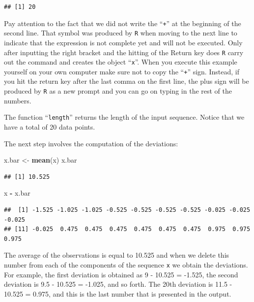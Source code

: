 \documentclass[]{krantz}
\makeatletter
\newenvironment{Shaded}{\begin{snugshade}}{\end{snugshade}}
\newcommand{\KeywordTok}[1]{\textcolor[rgb]{0.13,0.29,0.53}{\textbf{#1}}}
\newcommand{\NormalTok}[1]{#1}
\newcommand{\OperatorTok}[1]{\textcolor[rgb]{0.81,0.36,0.00}{\textbf{#1}}}
\newcommand{\StringTok}[1]{\textcolor[rgb]{0.31,0.60,0.02}{#1}}
\newenvironment{kframe}{%
\medskip{}
\setlength{\fboxsep}{.8em}
 \def\at@end@of@kframe{}%
 \ifinner\ifhmode%
  \def\at@end@of@kframe{\end{minipage}}%
  \begin{minipage}{\columnwidth}%
 \fi\fi%
 \def\FrameCommand##1{\hskip\@totalleftmargin \hskip-\fboxsep
 \colorbox{shadecolor}{##1}\hskip-\fboxsep
     \hskip-\linewidth \hskip-\@totalleftmargin \hskip\columnwidth}%
 \MakeFramed {\advance\hsize-\width
   \@totalleftmargin\z@ \linewidth\hsize
   \@setminipage}}%
 {\par\unskip\endMakeFramed%
 \at@end@of@kframe}
\renewenvironment{Shaded}{\begin{kframe}}{\end{kframe}}
\theoremstyle{definition}
\theoremstyle{definition}
\theoremstyle{definition}
\theoremstyle{remark}
\makeatother
\begin{document}
\begin{verbatim}
## [1] 20
\end{verbatim}

Pay attention to the fact that we did not write the ``\texttt{+}'' at the
beginning of the second line. That symbol was produced by \texttt{R} when
moving to the next line to indicate that the expression is not complete
yet and will not be executed. Only after inputting the right bracket and
the hitting of the Return key does \texttt{R} carry out the command and creates
the object ``\texttt{x}''. When you execute this example yourself on your own
computer make sure not to copy the ``\texttt{+}'' sign. Instead, if you hit the
return key after the last comma on the first line, the plus sign will be
produced by \texttt{R} as a new prompt and you can go on typing in the rest of
the numbers.

The function ``\texttt{length}'' returns the length of the input sequence. Notice
that we have a total of 20 data points.

The next step involves the computation of the deviations:

\begin{Shaded}
\begin{Highlighting}[]
\NormalTok{x.bar <-}\StringTok{ }\KeywordTok{mean}\NormalTok{(x)}
\NormalTok{x.bar}
\end{Highlighting}
\end{Shaded}

\begin{verbatim}
## [1] 10.525
\end{verbatim}

\begin{Shaded}
\begin{Highlighting}[]
\NormalTok{x }\OperatorTok{-}\StringTok{ }\NormalTok{x.bar}
\end{Highlighting}
\end{Shaded}

\begin{verbatim}
##  [1] -1.525 -1.025 -1.025 -0.525 -0.525 -0.525 -0.525 -0.025 -0.025 -0.025
## [11] -0.025  0.475  0.475  0.475  0.475  0.475  0.475  0.975  0.975  0.975
\end{verbatim}

The average of the observations is equal to 10.525 and when we delete
this number from each of the components of the sequence \texttt{x} we obtain
the deviations. For example, the first deviation is obtained as 9 -
10.525 = -1.525, the second deviation is 9.5 - 10.525 = -1.025, and so
forth. The 20th deviation is 11.5 - 10.525 = 0.975, and this is the last
number that is presented in the output.
\end{document}
